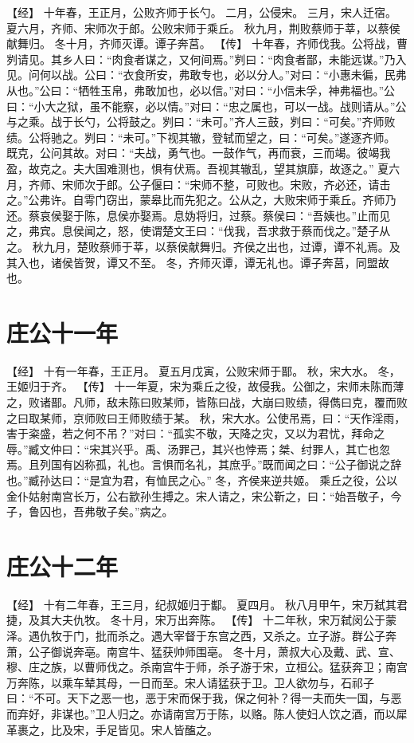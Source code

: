 \documentclass[a4paper,12pt,UTF8,twoside]{ctexbook}
\begin{document}
【经】
十年春，王正月，公败齐师于长勺。
二月，公侵宋。
三月，宋人迁宿。
夏六月，齐师、宋师次于郎。公败宋师于乘丘。
秋九月，荆败蔡师于莘，以蔡侯献舞归。
冬十月，齐师灭谭。谭子奔莒。
【传】
十年春，齐师伐我。公将战，曹刿请见。其乡人曰：“肉食者谋之，又何间焉。”刿曰：“肉食者鄙，未能远谋。”乃入见。问何以战。公曰：“衣食所安，弗敢专也，必以分人。”对曰：“小惠未徧，民弗从也。”公曰：“牺牲玉帛，弗敢加也，必以信。”对曰：“小信未孚，神弗福也。”公曰：“小大之狱，虽不能察，必以情。”对曰：“忠之属也，可以一战。战则请从。”公与之乘。战于长勺，公将鼓之。刿曰：“未可。”齐人三鼓，刿曰：“可矣。”齐师败绩。公将驰之。刿曰：“未可。”下视其辙，登轼而望之，曰：“可矣。”遂逐齐师。
既克，公问其故。对曰：“夫战，勇气也。一鼓作气，再而衰，三而竭。彼竭我盈，故克之。夫大国难测也，惧有伏焉。吾视其辙乱，望其旗靡，故逐之。”
夏六月，齐师、宋师次于郎。公子偃曰：“宋师不整，可败也。宋败，齐必还，请击之。”公弗许。自雩门窃出，蒙皋比而先犯之。公从之，大败宋师于乘丘。齐师乃还。蔡哀侯娶于陈，息侯亦娶焉。息妫将归，过蔡。蔡侯曰：“吾姨也。”止而见之，弗宾。息侯闻之，怒，使谓楚文王曰：“伐我，吾求救于蔡而伐之。”楚子从之。
秋九月，楚败蔡师于莘，以蔡侯献舞归。齐侯之出也，过谭，谭不礼焉。及其入也，诸侯皆贺，谭又不至。
冬，齐师灭谭，谭无礼也。谭子奔莒，同盟故也。

\section{庄公十一年}

【经】
十有一年春，王正月。
夏五月戊寅，公败宋师于鄑。
秋，宋大水。
冬，王姬归于齐。
【传】
十一年夏，宋为乘丘之役，故侵我。公御之，宋师未陈而薄之，败诸鄑。凡师，敌未陈曰败某师，皆陈曰战，大崩曰败绩，得儁曰克，覆而败之曰取某师，京师败曰王师败绩于某。
秋，宋大水。公使吊焉，曰：“天作淫雨，害于粢盛，若之何不吊？”对曰：“孤实不敬，天降之灾，又以为君忧，拜命之辱。”臧文仲曰：“宋其兴乎。禹、汤罪己，其兴也悖焉；桀、纣罪人，其亡也忽焉。且列国有凶称孤，礼也。言惧而名礼，其庶乎。”既而闻之曰：“公子御说之辞也。”臧孙达曰：“是宜为君，有恤民之心。”
冬，齐侯来逆共姬。
乘丘之役，公以金仆姑射南宫长万，公右歂孙生搏之。宋人请之，宋公靳之，曰：“始吾敬子，今子，鲁囚也，吾弗敬子矣。”病之。

\section{庄公十二年}

【经】
十有二年春，王三月，纪叔姬归于酅。
夏四月。
秋八月甲午，宋万弑其君捷，及其大夫仇牧。
冬十月，宋万出奔陈。
【传】
十二年秋，宋万弑闵公于蒙泽。遇仇牧于门，批而杀之。遇大宰督于东宫之西，又杀之。立子游。群公子奔萧，公子御说奔亳。南宫牛、猛获帅师围亳。
冬十月，萧叔大心及戴、武、宣、穆、庄之族，以曹师伐之。杀南宫牛于师，杀子游于宋，立桓公。猛获奔卫；南宫万奔陈，以乘车辇其母，一日而至。宋人请猛获于卫。卫人欲勿与，石祁子曰：“不可。天下之恶一也，恶于宋而保于我，保之何补？得一夫而失一国，与恶而弃好，非谋也。”卫人归之。亦请南宫万于陈，以赂。陈人使妇人饮之酒，而以犀革裹之，比及宋，手足皆见。宋人皆醢之。
\end{document}
